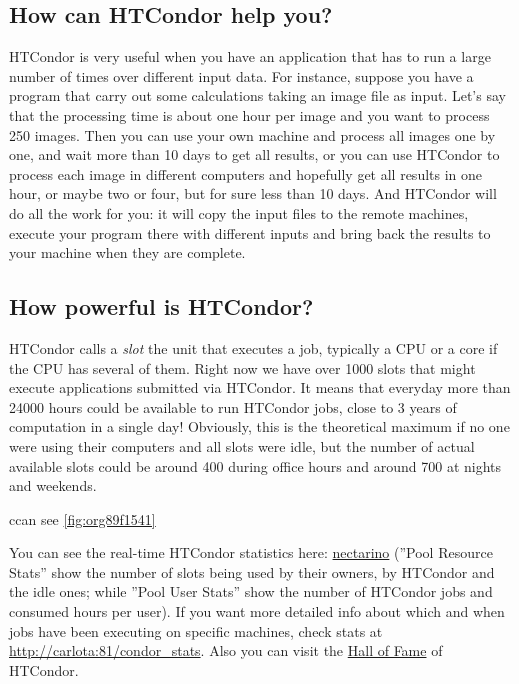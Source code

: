 \documentclass[a4paper,10pt]{article}
\begin{document}
\subsection{How can HTCondor help you?}
\label{sec:org6bf5527}

HTCondor is very useful when you have an application that has to run a large
number of times over different input data. For instance, suppose you have a
program that carry out some calculations taking an image file as input. Let's
say that the processing time is about one hour per image and you want to process
250 images. Then you can use your own machine and process all images one by one,
and wait more than 10 days to get all results, or you can use HTCondor to
process each image in different computers and hopefully get all results in one
hour, or maybe two or four, but for sure less than 10 days. And HTCondor will do
all the work for you: it will copy the input files to the remote machines,
execute your program there with different inputs and bring back the results to
your machine when they are complete.

\subsection{How \textbf{powerful} is HTCondor?}
\label{sec:orga0e6605}

HTCondor calls a \emph{slot} the unit that executes a job, typically a CPU or a core
if the CPU has several of them. Right now we have over 1000 slots that might
execute applications submitted via HTCondor. It means that everyday more than
24000 hours could be available to run HTCondor jobs, close to 3 years of
computation in a single day! Obviously, this is the theoretical maximum if no
one were using their computers and all slots were idle, but the number of actual
available slots could be around 400 during office hours and around 700 at nights
and weekends.

ccan see \ref{fig:org89f1541}

You can see the real-time HTCondor statistics here: \href{http://nectarino}{nectarino} (''Pool
Resource Stats'' show the number of slots being used by their owners, by
HTCondor and the idle ones; while ''Pool User Stats'' show the number of
HTCondor jobs and consumed hours per user). If you want more detailed info about
which and when jobs have been executing on specific machines, check stats at
\url{http://carlota:81/condor\_stats}. Also you can visit the
\href{http://venus/SIE/forum/viewtopic.php?f=8\&t=38}{Hall of Fame} of HTCondor. 
\end{document}
